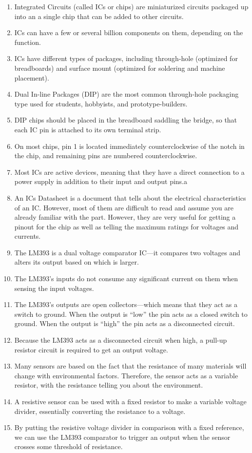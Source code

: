 \begin{enumerate}
\item Integrated Circuits (called ICs or chips) are miniaturized circuits packaged up into an a single chip that can be added to other circuits.
\item ICs can have a few or several billion components on them, depending on the function.
\item ICs have different types of packages, including through-hole (optimized for breadboards) and surface mount (optimized for soldering and machine placement).
\item Dual In-line Packages (DIP) are the most common through-hole packaging type used for students, hobbyists, and prototype-builders.
\item DIP chips should be placed in the breadboard saddling the bridge, so that each IC pin is attached to its own terminal strip.
\item On most chips, pin 1 is located immediately counterclockwise of the notch in the chip, and remaining pins are numbered counterclockwise.
\item Most ICs are active devices, meaning that they have a direct connection to a power supply in addition to their input and output pins.a
\item An ICs Datasheet is a document that tells about the electrical characteristics of an IC.  However, most of them are difficult to read and assume you are already familiar with the part.  However, they are very useful for getting a pinout for the chip as well as telling the maximum ratings for voltages and currents.
\item The LM393 is a dual voltage comparator IC---it compares two voltages and alters its output based on which is larger.
\item The LM393's inputs do not consume any significant current on them when sensing the input voltages.
\item The LM393's outputs are open collectors---which means that they act as a switch to ground.  When the output is ``low'' the pin acts as a closed switch to ground.  When the output is ``high'' the pin acts as a disconnected circuit.
\item Because the LM393 acts as a disconnected circuit when high, a pull-up resistor circuit is required to get an output voltage.
\item Many sensors are based on the fact that the resistance of many materials will change with environmental factors.  Therefore, the sensor acts as a variable resistor, with the resistance telling you about the environment.
\item A resistive sensor can be used with a fixed resistor to make a variable voltage divider, essentially converting the resistance to a voltage.
\item By putting the resistive voltage divider in comparison with a fixed reference, we can use the LM393 comparator to trigger an output when the sensor crosses some threshold of resistance.
\end{enumerate}

